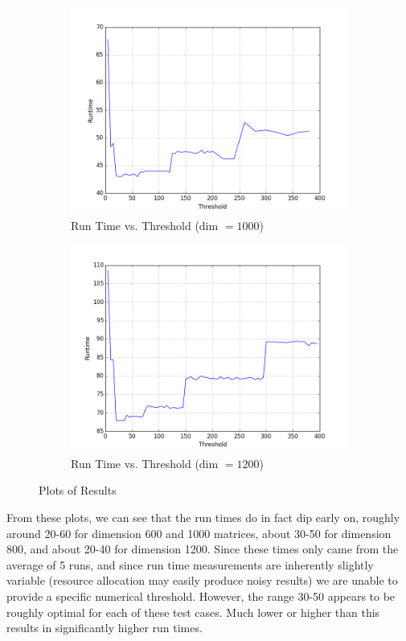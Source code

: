 \documentclass[12pt]{article}
\begin{document}
\begin{figure}
\begin{subfigure}{.5\textwidth}
  \includegraphics[width=\linewidth]{data/d1000.png}
  \caption{Run Time vs. Threshold (dim $= 1000$)}
  \label{fig:sub3}
\end{subfigure}%
\begin{subfigure}{.5\textwidth}
  \centering
  \includegraphics[width=\linewidth]{data/d1200.png}
  \caption{Run Time vs. Threshold (dim $= 1200$)}
  \label{fig:sub4}
\end{subfigure}%
\caption{Plots of Results}
\label{results}
\end{figure}

From these plots, we can see that the run times do in fact dip early on, roughly around 20-60 for dimension 600 and 1000 matrices, about 30-50 for dimension 800, and about 20-40 for dimension 1200. Since these times only came from the average of 5 runs, and since run time measurements are inherently slightly variable (resource allocation may easily produce noisy results) we are unable to provide a specific numerical threshold. However, the range 30-50 appears to be roughly optimal for each of these test cases. Much lower or higher than this results in significantly higher run times. \\
\end{document}
